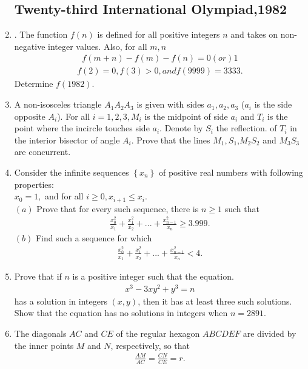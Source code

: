 \documentclass[12pt,-letter paper]{article}
\providecommand{\cbrak}[1]{\ensuremath{\left\{#1\right\}}}
\providecommand{\brak}[1]{\ensuremath{\left(#1\right)}}
\begin{document}
    \begin{enumerate}
\subsection*{Twenty-third International Olympiad,1982}
\item . The function $f\brak{n}$ is defined for all positive integers $n$ and takes on non-negative integer values. Also, for all $m,n$ 
\begin{align*}f\brak{m + n} - f\brak{m} - f\brak{n} = 0  \brak{or} 1 \end{align*} 
 \begin{align*}f\brak{2} = 0  , f\brak{3} > 0,and  f\brak{9999} = 3333.\end{align*}
		Determine $f\brak{1982}.$
	\item A non-isosceles triangle $A_1 A_2 A_3$ is given with sides $a_1,a_2,a_3$ ($a_i$ is the side opposite $A_i$). For all $i = 1, 2, 3, M_i$ is the midpoint of side $a_i$ and $T_i$ is the point where the incircle touches side $a_i$. Denote by $S_i$ the reflection. of $T_i$ in the interior bisector of angle $A_i$. Prove that the lines $M_1,S_1$,$ M_2S_2$ and $M_3S_3$ are concurrent.
\item Consider the infinite sequences $\cbrak{x_n}$ of positive real numbers with following properties: \\
		$ x_{0}=1,$ and for  all  $i \geq 0, x_{i+1} \leq x_i.$ \\
\brak{a} Prove that for every such sequence, there is $n \geq 1$ such that
		    \begin{align*} \frac{x^{2}_{0}}{x_{1}}+ \frac{x^{2}_{1}}{x_{2}}+ ...+\frac{x^{2}_{n-1}}{x_{n}} \geq 3.999.\end{align*}
\brak{b} Find such a sequence for which
 \begin{align*} \frac{x^{2}_{0}}{x_{1}}+ \frac{x^{2}_{1}}{x_{2}}+ ...+\frac{x^{2}_{n-1}}{x_{n}}< 4.\end{align*}
	    \item Prove that if $n$ is a positive integer such that the equation. \begin{align*}x^3 - 3xy^2 + y^3 = n \end{align*}  has a solution in integers $\brak{x, y}$, then it has at least three such solutions. Show that the equation has no solutions in integers when $n = 2891.$ 
\item The diagonals $AC$ and $CE$ of the regular hexagon $ABCDEF$ are divided by the inner points $M$ and $N$, respectively, so that \begin{align*} \frac{AM}{AC}=\frac{CN}{CE}=r.

\end{align*}
\end{enumerate}
\end{document}

